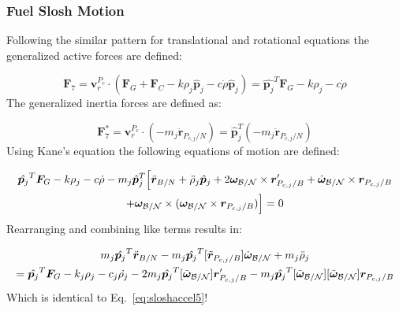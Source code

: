 \subsubsection{Fuel Slosh Motion}
Following the similar pattern for translational and rotational equations the generalized active forces are defined:

\begin{equation}
	\bm F_{7} = \bm v^{P_c}_{r} \cdot (\bm F_G + \bm F_C -k\rho_j \hat{\bm p}_j - c \dot{\rho} \hat{\bm p}_j) = \hat{\bm p_j}^T \bm F_G -k\rho_j - c \dot{\rho}
\end{equation}
The generalized inertia forces are defined as: 

\begin{equation}
	\bm F^*_{7} = \bm v^{P_c}_{r} \cdot (-m_j \ddot{\bm r}_{P_{c,j}/N}) = \hat{\bm p}_j^T (-m_j \ddot{\bm r}_{P_{c,j}/N})
\end{equation}
Using Kane's equation the following equations of motion are defined:

\begin{multline}
	\hat{\bm p_j}^T \bm F_G -k\rho_j - c \dot{\rho} - m_j \hat{\bm p}_j^T \Big[\ddot{\bm r}_{B/N} + \ddot{\rho}_j \hat{\bm p}_j  +2 \bm\omega_{\cal B/N} \times \bm{r}'_{P_{c,j}/B} + \dot{\bm\omega}_{\cal B/N} \times \bm{r}_{P_{c,j}/B}  \\
	+\bm\omega_{\cal B/N} \times (\bm\omega_{\cal B/N} \times \bm{r}_{P_{c,j}/B})\Big] = 0 
\end{multline}
Rearranging and combining like terms results in:

\begin{multline}
	m_j \hat{\bm p_j}^T \ddot{\bm{r}}_{B/N} - m_j \hat{\bm p_j}^T [\tilde{\bm{r}}_{P_{c,j}/B}] \dot{\bm\omega}_{\cal B/N} + m_j \ddot{\rho}_j  \\
	= \hat{\bm p_j}^T \bm F_G - k_j \rho_j - c_j \dot{\rho_j} - 2 m_j \hat{\bm p_j}^T  [\tilde{\bm\omega}_{\cal B/N}] \bm{r}'_{P_{c,j}/B}  - m_j \hat{\bm p_j}^T [\tilde{\bm\omega}_{\cal B/N}] [\tilde{\bm\omega}_{\cal B/N}] \bm{r}_{P_{c,j}/B} 
	\label{eq:sloshaccel6}
\end{multline}	
Which is identical to Eq.~\eqref{eq:sloshaccel5}!


